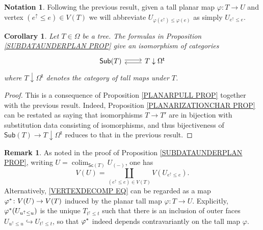 \documentclass[a4paper,10pt
,draft
]{article}%
\numberwithin{equation}{section}
\numberwithin{figure}{section}
\newtheorem{corollary}[equation]{Corollary}%
\theoremstyle{definition} %
\newtheorem{remark}[equation]{Remark}%
\newtheorem{notation}[equation]{Notation}%
\DeclareMathOperator{\colim}{colim}%
\newcommand{\1}{\ensuremath{\mathbbm 1}}%
\begin{document}
\begin{notation}\label{UEUPE NOT}
	Following the previous result, 
	given a tall planar map 
	$\varphi \colon T \to U$
	and vertex
	$(e^{\uparrow} \leq e) \in V(T)$
	we will abbreviate
	$U_{\varphi(e^{\uparrow}) \leq \varphi(e)}$
	as simply
	$U_{e^{\uparrow} \leq e}$.
\end{notation}


\begin{corollary}\label{SUBDATAUNDERPLAN COR}
Let $T \in \Omega$ be a tree. The formulas in
Proposition \ref{SUBDATAUNDERPLAN PROP}
give an isomorphism of categories
\[
\begin{tikzcd}[row sep =0pt]
	\mathsf{Sub}(T) \ar[r,shift left=2pt] &
	T \downarrow \Omega^{\mathsf{t}} \ar[l,shift left=2pt]
\end{tikzcd}
\]
where $T \downarrow \Omega^{\mathsf{t}}$ denotes
the category of tall maps under $T$.
\end{corollary}


\begin{proof}
	This is a consequence of Proposition \ref{PLANARPULL PROP} together with the previous result.
	Indeed, Proposition \ref{PLANARIZATIONCHAR PROP} can be restated as saying that isomorphisms $T \to T'$ are in bijection with substitution data consisting of isomorphisms, and thus  bijectiveness of $\mathsf{Sub}(T) \to T \downarrow \Omega^{\mathsf{t}}$ reduces to that in the previous result.
\end{proof}

\begin{remark}\label{VERTEXDECOMP REM}
As noted in the proof of Proposition \ref{SUBDATAUNDERPLAN PROP}, writing $U = \colim_{\mathsf{Sc}(T)}U_{(\minus)}$,
	one has 
\begin{equation}\label{VERTEXDECOMP EQ}
	V(U) = \coprod_{(e^{\uparrow} \leq e) \in V(T)}
	V(U_{e^{\uparrow} \leq e}).
  \end{equation}
    Alternatively, \eqref{VERTEXDECOMP EQ} can be regarded as a map 
    $\varphi^{\**} \colon V(U) \to V(T)$ induced by the planar tall map 
    $\varphi \colon T \to U$.
    Explicitly, $\varphi^{\**}(U_{u^{\uparrow} \leq u})$ 
    is the unique $T_{t^{\uparrow}\leq t}$ such that
    there is an inclusion of outer faces $U_{u^{\uparrow} \leq u} \hookrightarrow U_{t^{\uparrow} \leq t}$,
    so that $\varphi^{\**}$ indeed depends contravariantly on the tall map $\varphi$.
\end{remark}
\end{document}
